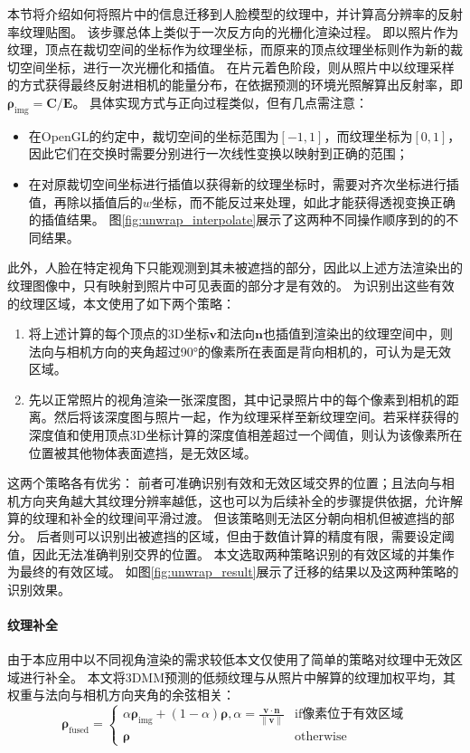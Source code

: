本节将介绍如何将照片中的信息迁移到人脸模型的纹理中，并计算高分辨率的反射率纹理贴图。
该步骤总体上类似于一次反方向的光栅化渲染过程。
即以照片作为纹理，顶点在裁切空间的坐标作为纹理坐标，而原来的顶点纹理坐标则作为新的裁切空间坐标，进行一次光栅化和插值。
在片元着色阶段，则从照片中以纹理采样的方式获得最终反射进相机的能量分布，在依据预测的环境光照解算出反射率，即$\mathbf{\rho}_\mathrm{img} = \mathbf{C} / \mathbf{E}$。
具体实现方式与正向过程类似，但有几点需注意：
\begin{itemize}
\item 在OpenGL的约定中，裁切空间的坐标范围为$[-1,1]$，而纹理坐标为$[0,1]$，因此它们在交换时需要分别进行一次线性变换以映射到正确的范围；
\item 在对原裁切空间坐标进行插值以获得新的纹理坐标时，需要对齐次坐标进行插值，再除以插值后的$w$坐标，而不能反过来处理，如此才能获得透视变换正确的插值结果。
图\ref{fig:unwrap_interpolate}展示了这两种不同操作顺序到的的不同结果。
\end{itemize}

此外，人脸在特定视角下只能观测到其未被遮挡的部分，因此以上述方法渲染出的纹理图像中，只有映射到照片中可见表面的部分才是有效的。
为识别出这些有效的纹理区域，本文使用了如下两个策略：
\begin{enumerate}
\item 将上述计算的每个顶点的3D坐标$\mathbf{v}$和法向$\mathbf{n}$也插值到渲染出的纹理空间中，则法向与相机方向的夹角超过90°的像素所在表面是背向相机的，可认为是无效区域。
\item 先以正常照片的视角渲染一张深度图，其中记录照片中的每个像素到相机的距离。然后将该深度图与照片一起，作为纹理采样至新纹理空间。若采样获得的深度值和使用顶点3D坐标计算的深度值相差超过一个阈值，则认为该像素所在位置被其他物体表面遮挡，是无效区域。
\end{enumerate}
这两个策略各有优劣：
前者可准确识别有效和无效区域交界的位置；且法向与相机方向夹角越大其纹理分辨率越低，这也可以为后续补全的步骤提供依据，允许解算的纹理和补全的纹理间平滑过渡。
但该策略则无法区分朝向相机但被遮挡的部分。
后者则可以识别出被遮挡的区域，但由于数值计算的精度有限，需要设定阈值，因此无法准确判别交界的位置。
本文选取两种策略识别的有效区域的并集作为最终的有效区域。
如图\ref{fig:unwrap_result}展示了迁移的结果以及这两种策略的识别效果。

\paragraph{纹理补全}
由于本应用中以不同视角渲染的需求较低本文仅使用了简单的策略对纹理中无效区域进行补全。
本文将3DMM预测的低频纹理与从照片中解算的纹理加权平均，其权重与法向与相机方向夹角的余弦相关：
\begin{equation}
\mathbf{\rho}_\mathrm{fused} = \begin{cases}
    \alpha \mathbf{\rho}_\mathrm{img} + (1-\alpha) \mathbf{\rho}, \alpha = \frac{\mathbf{v}\cdot\mathbf{n}}{\|\mathbf{v}\|} & \text{if像素位于有效区域} \\
\mathbf{\rho} & \text{otherwise}
\end{cases}
\label{eq:texture_fusion}
\end{equation}

